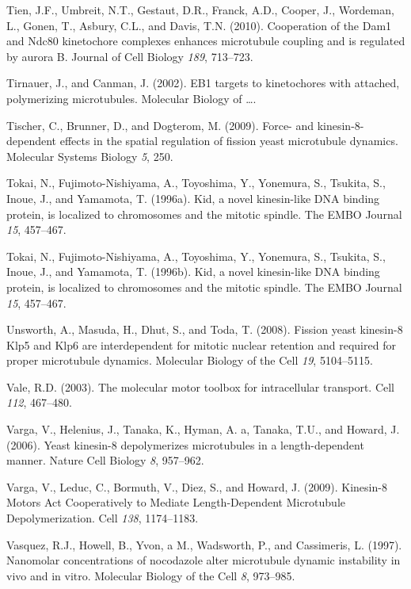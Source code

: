 \documentclass[12pt,a4paper,twoside,openright]{book}
\begin{document}
\hypertarget{ref-Tien2010}{}
Tien, J.F., Umbreit, N.T., Gestaut, D.R., Franck, A.D., Cooper, J.,
Wordeman, L., Gonen, T., Asbury, C.L., and Davis, T.N. (2010).
Cooperation of the Dam1 and Ndc80 kinetochore complexes enhances
microtubule coupling and is regulated by aurora B. Journal of Cell
Biology \emph{189}, 713--723.

\hypertarget{ref-Tirnauer2002}{}
Tirnauer, J., and Canman, J. (2002). EB1 targets to kinetochores with
attached, polymerizing microtubules. Molecular Biology of \ldots{}.

\hypertarget{ref-Tischer2009}{}
Tischer, C., Brunner, D., and Dogterom, M. (2009). Force- and
kinesin-8-dependent effects in the spatial regulation of fission yeast
microtubule dynamics. Molecular Systems Biology \emph{5}, 250.

\hypertarget{ref-Tokai1996a}{}
Tokai, N., Fujimoto-Nishiyama, A., Toyoshima, Y., Yonemura, S., Tsukita,
S., Inoue, J., and Yamamota, T. (1996a). Kid, a novel kinesin-like DNA
binding protein, is localized to chromosomes and the mitotic spindle.
The EMBO Journal \emph{15}, 457--467.

\hypertarget{ref-Tokai1996}{}
Tokai, N., Fujimoto-Nishiyama, A., Toyoshima, Y., Yonemura, S., Tsukita,
S., Inoue, J., and Yamamota, T. (1996b). Kid, a novel kinesin-like DNA
binding protein, is localized to chromosomes and the mitotic spindle.
The EMBO Journal \emph{15}, 457--467.

\hypertarget{ref-Unsworth2008}{}
Unsworth, A., Masuda, H., Dhut, S., and Toda, T. (2008). Fission yeast
kinesin-8 Klp5 and Klp6 are interdependent for mitotic nuclear retention
and required for proper microtubule dynamics. Molecular Biology of the
Cell \emph{19}, 5104--5115.

\hypertarget{ref-Vale2003}{}
Vale, R.D. (2003). The molecular motor toolbox for intracellular
transport. Cell \emph{112}, 467--480.

\hypertarget{ref-Varga2006}{}
Varga, V., Helenius, J., Tanaka, K., Hyman, A. a, Tanaka, T.U., and
Howard, J. (2006). Yeast kinesin-8 depolymerizes microtubules in a
length-dependent manner. Nature Cell Biology \emph{8}, 957--962.

\hypertarget{ref-Varga2009}{}
Varga, V., Leduc, C., Bormuth, V., Diez, S., and Howard, J. (2009).
Kinesin-8 Motors Act Cooperatively to Mediate Length-Dependent
Microtubule Depolymerization. Cell \emph{138}, 1174--1183.

\hypertarget{ref-Vasquez1997}{}
Vasquez, R.J., Howell, B., Yvon, a M., Wadsworth, P., and Cassimeris, L.
(1997). Nanomolar concentrations of nocodazole alter microtubule dynamic
instability in vivo and in vitro. Molecular Biology of the Cell
\emph{8}, 973--985.
\end{document}
